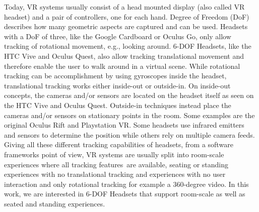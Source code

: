 Today, VR systems usually consist of a head mounted display (also called VR headset) and a pair of controllers, one for each hand. 
Degree of Freedom (DoF) describes how many geometric aspects are captured and can be used. Headsets with a DoF of three, like the Google Cardboard or Oculus Go, only allow tracking of rotational movement, e.g., looking around. 6-DOF Headsets, like the HTC Vive and Oculus Quest, also allow tracking translational movement and therefore enable the user to walk around in a virtual scene. 
While rotational tracking can be accomplishment by using gyroscopes inside the headset, translational tracking works either inside-out or outside-in. On inside-out concepts, the cameras and/or sensors are located on the headset itself as seen on the HTC Vive and Oculus Quest. Outside-in techniques instead place the cameras and/or sensors on stationary points in the room. Some examples are the original Oculus Rift and Playstation VR.
Some headsets use infrared emitters and sensors to determine the position while others rely on multiple camera feeds.
Giving all these different tracking capabilities of headsets, from a software frameworks point of view, VR systems are usually split into room-scale \label{exp:vr-experience}experiences where all tracking features are available, seating or standing experiences with no translational tracking and experiences with no user interaction and only rotational tracking for example a 360-degree video. In this work, we are interested in 6-DOF Headsets that support room-scale as well as seated and standing experiences.